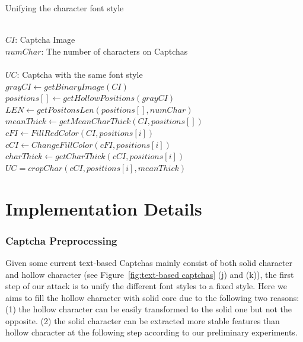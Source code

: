     \begin{algorithm}[!t]
        \centering
        \caption{Unifying the character font style}
        \label{alg:unify_font_style}
        \begin{algorithmic}[1]
            \REQUIRE~~\\
                $CI$: Captcha Image  \\
                $numChar$: The number of characters on Captchas\\
            \ENSURE~~\\
                $UC$: Captcha with the same font style \\
            \STATE $grayCI \leftarrow getBinaryImage(CI)$ \\
            \STATE $positions[] \leftarrow getHollowPositions(grayCI)$ \\
            \STATE $LEN \leftarrow getPositonsLen(positions[], numChar)$ \\
            \STATE $meanThick \leftarrow getMeanCharThick(CI, positions[])$ \\
                \STATE $cFI \leftarrow FillRedColor(CI, positions[i])$ \\
                \STATE $cCI \leftarrow ChangeFillColor(cFI, positions[i])$ \\
                \STATE $charThick \leftarrow getCharThick(cCI, positions[i])$ \\
                    \STATE $UC=cropChar(cCI, positions[i], meanThick)$ \\
                \ENDIF
            \ENDFOR
        \end{algorithmic}
    \end{algorithm}
\section{Implementation Details}

\subsubsection{Captcha Preprocessing}
Given some current text-based Captchas mainly consist of both solid character and hollow character (see Figure~\ref{fig:text-based captchas} (j) and (k)), the first step of our attack is to unify the different font styles to a fixed style. Here we aims to fill the hollow character with solid core due to the following two reasons:
(1) the hollow character can be easily transformed to the solid one but not the opposite.
(2) the solid character can be extracted more stable features than hollow character at the following step according to our preliminary experiments.

